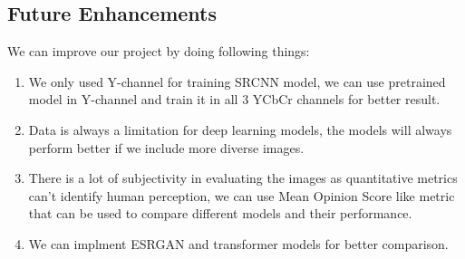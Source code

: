 \subsection{Future Enhancements}
We can improve our project by doing following things:
\begin{enumerate}
    \item We only used Y-channel for training SRCNN model, we can use pretrained model in Y-channel and train it in all 3 YCbCr channels for better result.
    \item Data is always a limitation for deep learning models, the models will always perform better if we include more diverse images.
    \item There is a lot of subjectivity in evaluating the images as quantitative metrics can't identify human perception, we can use Mean Opinion Score like metric that can be used to compare different models and their performance.
    \item  We can implment ESRGAN and transformer models for better comparison.
\end{enumerate}
